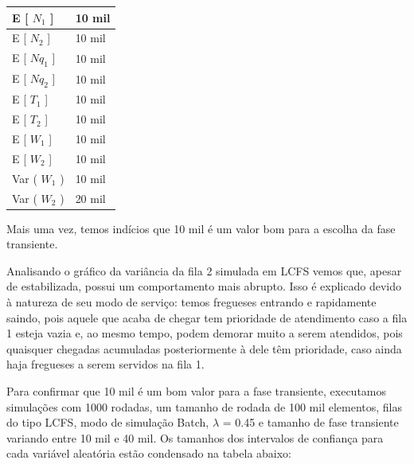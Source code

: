 \documentclass[a4paper,10pt]{article}
\begin{document}
\begin{center}
\begin{tabular} { | l | l | }
    \hline
    E [ $N_1$ ]  & 10 mil \\ \hline
    E [ $N_2$ ] & 10 mil \\ \hline
    E [ $Nq_1$ ] & 10 mil \\ \hline
    E [ $Nq_2$ ]	& 10 mil \\ \hline
    E [ $T_1$ ] & 10 mil \\ \hline
    E [ $T_2$ ] & 10 mil \\ \hline
    E [ $W_1$ ] & 10 mil \\ \hline
    E [ $W_2$ ] & 10 mil \\ \hline
    Var ( $W_1$ ) & 10 mil \\ \hline
    Var ( $W_2$ ) & 20 mil \\ \hline
\end{tabular}
\end{center}

    Mais uma vez, temos indícios que 10 mil é um valor bom para a escolha da fase transiente.

    Analisando o gráfico da variância da fila 2 simulada em LCFS vemos que, apesar de estabilizada, possui um comportamento mais abrupto. Isso é explicado devido à natureza de seu modo de serviço: temos fregueses entrando e rapidamente saindo, pois aquele que acaba de chegar tem prioridade de atendimento caso a fila 1 esteja vazia e, ao mesmo tempo, podem demorar muito a serem atendidos, pois quaisquer chegadas acumuladas posteriormente à dele têm prioridade, caso ainda haja fregueses a serem servidos na fila 1.

    Para confirmar que 10 mil é um bom valor para a fase transiente, executamos simulações com 1000 rodadas, um tamanho de rodada de 100 mil elementos, filas do tipo LCFS, modo de simulação Batch, $\lambda$ = 0.45 e tamanho de fase transiente variando entre 10 mil e 40 mil. Os tamanhos dos intervalos de confiança para cada variável aleatória estão condensado na tabela abaixo:
\end{document}
